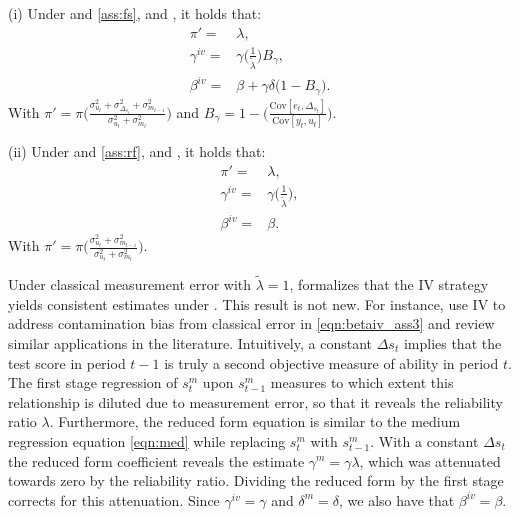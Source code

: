 \begin{proposition}\label{prop:iv}
\indent (i) Under  and \ref{ass:fs}, and , it holds that: 
    \begin{align}
       \pi'=&\lambda, \\
         \gamma^{iv}=&\gamma \Bigg(\frac{1}{\widetilde{\lambda}}\Bigg) B_{\gamma}, \\
        \beta^{iv}=& \beta+\gamma\delta\bigg(1-B_{\gamma}\bigg).    
    \end{align} 
With $\pi'=\pi \Bigg( \frac{\sigma_{u_{t}}^2+ \sigma_{\Delta_{s_t}}^2+\sigma_{m_{t-1}}^2}{\sigma_{u_{t}}^2+\sigma_{m_{t}}^2}\Bigg)$ and $B_{\gamma}= 1 -  \Bigg(\frac{\mathrm{Cov}[e_{t},\Delta_{s_t}]}{\mathrm{Cov}[y_{t},u_{t}]}\Bigg)$.  

\vspace*{.2in}
\indent (ii) Under  and \ref{ass:rf}, and , it holds that: 
    \begin{align}
        \pi'=&\lambda, \\
        \gamma^{iv}=&\gamma \Bigg(\frac{1}{\widetilde{\lambda}}\Bigg), \\
        \label{eqn:betaiv_ass3}
        \beta^{iv}=&\beta.          
    \end{align}
With $\pi'=\pi \Bigg( \frac{\sigma_{u_{t}}^2+\sigma_{m_{t-1}}^2}{\sigma_{u_{t}}^2+\sigma_{m_{t}}^2}\Bigg)$.  
\end{proposition}

Under classical measurement error with $\widetilde{\lambda}=1$,  formalizes that the IV strategy yields consistent estimates under . This result is not new. For instance, \cite{gillen2019experimenting} use IV to address contamination bias from classical error in \eqref{eqn:betaiv_ass3} and review similar applications in the literature. Intuitively, a constant $\Delta{s_{t}}$ implies that the test score in period $t-1$ is truly a second objective measure of ability in period $t$. The first stage regression of $s_{t}^m$ upon $s_{t-1}^m$ measures to which extent this relationship is diluted due to measurement error, so that it reveals the reliability ratio $\lambda$.
%
Furthermore, the reduced form equation is similar to the medium regression equation \eqref{eqn:med} while replacing $s_{t}^m$ with $s_{t-1}^m$. With a constant $\Delta{s_{t}}$ the reduced form coefficient reveals the estimate $\gamma^m=\gamma\lambda$, which was attenuated towards zero by the reliability ratio. Dividing the reduced form by the first stage corrects for this attenuation. Since $\gamma^{iv}=\gamma$ and $\delta^m=\delta$, we also have that $\beta^{iv}=\beta$.

